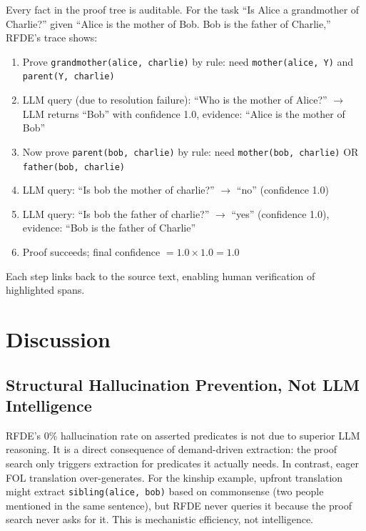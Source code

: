 \documentclass[11pt,letterpaper]{article}
\begin{document}
Every fact in the proof tree is auditable. For the task ``Is Alice a grandmother of
Charlie?'' given ``Alice is the mother of Bob. Bob is the father of Charlie,'' RFDE's trace
shows:
\begin{enumerate}
  \item Prove \texttt{grandmother(alice, charlie)} by rule: need \texttt{mother(alice, Y)} and
    \texttt{parent(Y, charlie)}
  \item LLM query (due to resolution failure): ``Who is the mother of Alice?'' $\rightarrow$
    LLM returns ``Bob'' with confidence 1.0, evidence: ``Alice is the mother of Bob''
  \item Now prove \texttt{parent(bob, charlie)} by rule: need \texttt{mother(bob, charlie)} OR
    \texttt{father(bob, charlie)}
  \item LLM query: ``Is bob the mother of charlie?'' $\rightarrow$ ``no'' (confidence 1.0)
  \item LLM query: ``Is bob the father of charlie?'' $\rightarrow$ ``yes'' (confidence 1.0),
    evidence: ``Bob is the father of Charlie''
  \item Proof succeeds; final confidence $= 1.0 \times 1.0 = 1.0$
\end{enumerate}

Each step links back to the source text, enabling human verification of highlighted spans.

\section{Discussion}

\subsection{Structural Hallucination Prevention, Not LLM Intelligence}

RFDE's 0\% hallucination rate on asserted predicates is not due to superior LLM reasoning. It
is a direct consequence of demand-driven extraction: the proof search only triggers extraction
for predicates it actually needs. In contrast, eager FOL translation over-generates. For the
kinship example, upfront translation might extract \texttt{sibling(alice, bob)} based on
commonsense (two people mentioned in the same sentence), but RFDE never queries it because the
proof search never asks for it. This is mechanistic efficiency, not intelligence.
\end{document}
